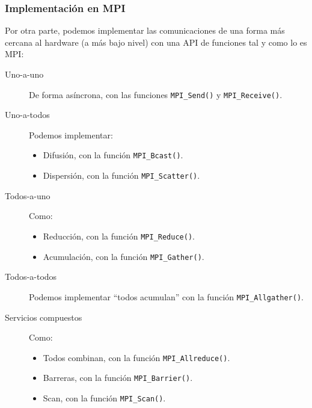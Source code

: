 \subsubsection{Implementación en MPI} 
Por otra parte, podemos implementar las comunicaciones de una forma más cercana al hardware (a más bajo nivel) con una API de funciones tal y como lo es MPI:
\begin{description}
    \item [Uno-a-uno] De forma asíncrona, con las funciones \verb|MPI_Send()| y \verb|MPI_Receive()|.
    \item [Uno-a-todos] Podemos implementar:
        \begin{itemize}
            \item Difusión, con la función \verb|MPI_Bcast()|.
            \item Dispersión, con la función \verb|MPI_Scatter()|.
        \end{itemize} 
    \item [Todos-a-uno] Como:
        \begin{itemize}
            \item Reducción, con la función \verb|MPI_Reduce()|.
            \item Acumulación, con la función \verb|MPI_Gather()|.
        \end{itemize}
    \item [Todos-a-todos] Podemos implementar ``todos acumulan'' con la función \verb|MPI_Allgather()|.
    \item [Servicios compuestos] Como:
        \begin{itemize}
            \item Todos combinan, con la función \verb|MPI_Allreduce()|.
            \item Barreras, con la función \verb|MPI_Barrier()|.
            \item Scan, con la función \verb|MPI_Scan()|.
        \end{itemize}
\end{description}

